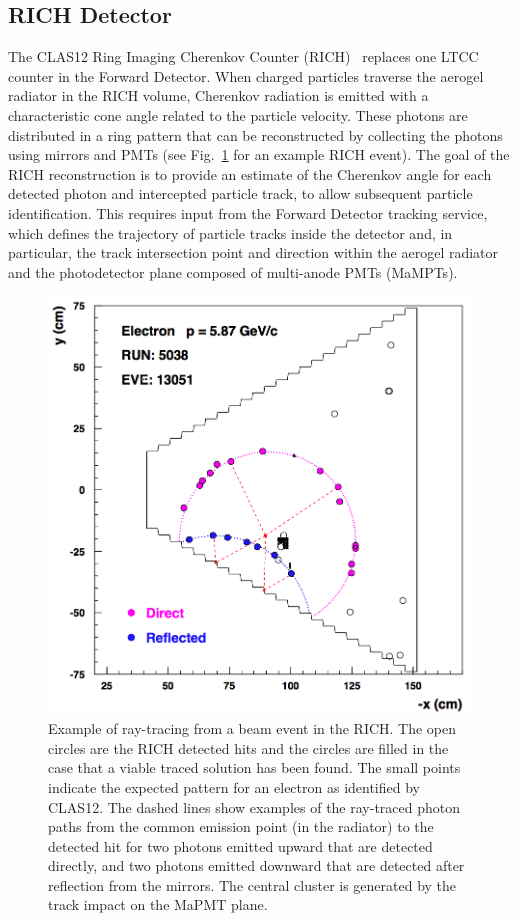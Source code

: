 \subsection{RICH Detector}

The CLAS12 Ring Imaging Cherenkov Counter (RICH)~\cite{rich-nim} replaces one LTCC counter in the
Forward Detector. When charged particles traverse the aerogel radiator in the RICH volume, Cherenkov
radiation is emitted with a characteristic cone angle related to the particle velocity. These photons are
distributed in a ring pattern that can be reconstructed by collecting the photons using mirrors and PMTs
(see Fig.~\ref{Fig:RayShow} for an example RICH event). The goal of the RICH reconstruction is to provide
an estimate of the Cherenkov angle for each detected photon and intercepted particle track, to allow
subsequent particle identification. This requires input from the Forward Detector tracking service, which
defines the trajectory of particle tracks inside the detector and, in particular, the track intersection point and
direction within the aerogel radiator and the photodetector plane composed of multi-anode PMTs (MaMPTs). 

\begin{figure}[t]
\begin{center}
\includegraphics[width=0.8\columnwidth]{pics/example.png}
\end{center}
\caption{Example of ray-tracing from a beam event in the RICH. The open circles are the RICH detected hits and
  the circles are filled in the case that a viable traced solution has been found. The small points indicate the
  expected pattern for an electron as identified by CLAS12. The dashed lines show examples of the ray-traced
  photon paths from the common emission point (in the radiator) to the detected hit for two photons emitted
  upward that are detected directly, and two photons emitted downward that are detected after reflection from
  the mirrors. The central cluster is generated by the track impact on the MaPMT plane.}
\label{Fig:RayShow}
\end{figure}

